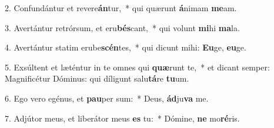 2. Confundántur et revere\textbf{án}tur,~*  qui quærunt \textbf{á}nimam \textbf{me}am.\

3. Avertántur retrórsum, et eru\textbf{bés}cant,~*  qui volunt \textbf{mi}hi \textbf{ma}la.\

4. Avertántur statim erube\textbf{scén}tes,~*  qui dicunt mihi: \textbf{Eu}ge, \textbf{eu}ge.\

5. Exsúltent et læténtur in te omnes qui \textbf{quæ}runt te,~*  et dicant semper: Magnificétur Dóminus: qui díligunt salu\textbf{tá}re \textbf{tu}um.\

6. Ego vero egénus, et \textbf{pau}per sum:~*  Deus, \textbf{ád}ju\textbf{va} me.\

7. Adjútor meus, et liberátor meus \textbf{es} tu:~*  Dómine, \textbf{ne} mo\textbf{ré}ris.\

